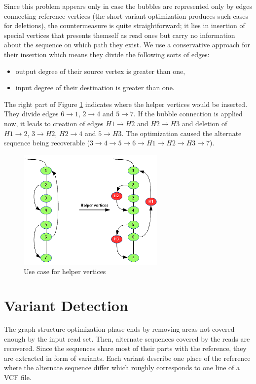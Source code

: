 Since this problem appears only in case the bubbles are represented only by edges connecting reference vertices (the short variant optimization produces such cases for deletions), the countermeasure is quite straightforward; it lies in insertion of special vertices that presents themself as read ones but carry no information about the sequence on which path they exist. We use a conservative approach for their insertion which means they divide the following sorts of edges:
\begin{itemize}
\item output degree of their source vertex is greater than one,
\item input degree of their destination is greater than one.
\end{itemize}

The right part of Figure \ref{fig:helper-vertices} indicates where the helper vertices would be inserted. They divide edges $6 \to 1$, $2 \to 4$ and $5 \to 7$. If the bubble connection is applied now, it leads to creation of edges $H1 \to H2$ and $H2 \to H3$ and deletion of $H1 \to 2$, $3 \to H2$, $H2 \to 4$ and $5 \to H3$. The optimization caused the alternate sequence being recoverable ($3 \to 4 \to 5 \to 6 \to H1 \to H2 \to H3 \to 7$).

\begin{figure}[h]
	\centering
	\includegraphics{img/helper-vertices.pdf}
	\caption{Use case for helper vertices}
	\label{fig:helper-vertices}
\end{figure}

\section{Variant Detection}
\label{sec:variant-detection}

The graph structure optimization phase ends by removing areas not covered enough by the input read set. Then, alternate sequences covered by the reads are recovered. Since the sequences share most of their parts with the reference, they are extracted in form of variants. Each variant describe one place of the reference where the alternate sequence differ which roughly corresponds to one line of a VCF file.

